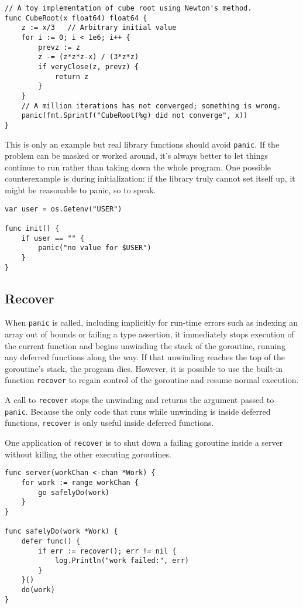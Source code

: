 \begin{Verbatim}[frame=single]
// A toy implementation of cube root using Newton's method.
func CubeRoot(x float64) float64 {
    z := x/3   // Arbitrary initial value
    for i := 0; i < 1e6; i++ {
        prevz := z
        z -= (z*z*z-x) / (3*z*z)
        if veryClose(z, prevz) {
            return z
        }
    }
    // A million iterations has not converged; something is wrong.
    panic(fmt.Sprintf("CubeRoot(%g) did not converge", x))
}
\end{Verbatim}

This is only an example but real library functions should avoid
\texttt{panic}. If the problem can be masked or worked around, it's
always better to let things continue to run rather than taking down the
whole program. One possible counterexample is during initialization: if
the library truly cannot set itself up, it might be reasonable to panic,
so to speak.

\begin{Verbatim}[frame=single]
var user = os.Getenv("USER")

func init() {
    if user == "" {
        panic("no value for $USER")
    }
}
\end{Verbatim}

\subsection*{Recover}

When \texttt{panic} is called, including implicitly for run-time errors
such as indexing an array out of bounds or failing a type assertion, it
immediately stops execution of the current function and begins unwinding
the stack of the goroutine, running any deferred functions along the
way. If that unwinding reaches the top of the goroutine's stack, the
program dies. However, it is possible to use the built-in function
\texttt{recover} to regain control of the goroutine and resume normal
execution.

A call to \texttt{recover} stops the unwinding and returns the argument
passed to \texttt{panic}. Because the only code that runs while
unwinding is inside deferred functions, \texttt{recover} is only useful
inside deferred functions.

One application of \texttt{recover} is to shut down a failing goroutine
inside a server without killing the other executing goroutines.

\begin{Verbatim}[frame=single]
func server(workChan <-chan *Work) {
    for work := range workChan {
        go safelyDo(work)
    }
}

func safelyDo(work *Work) {
    defer func() {
        if err := recover(); err != nil {
            log.Println("work failed:", err)
        }
    }()
    do(work)
}
\end{Verbatim}

